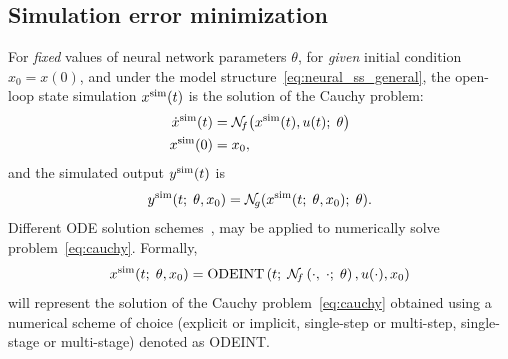 \documentclass{article} %
\newcommand{\NN}{\mathcal{N}} %
\newcommand{\simul}[1]{{#1}^{\rm sim}}
\newcommand{\est}{}
\begin{document}
{
\subsection{Simulation error minimization}
}
For \emph{fixed} values of neural network parameters $\theta$, for \emph{given} initial condition $x_0 = x(0)$, and under the model  structure~\eqref{eq:neural_ss_general},  the open-loop state simulation $\simul{x}(t)$ is the solution of the Cauchy problem:
\begin{subequations}
\label{eq:cauchy}
\begin{align}
{\simul{ \dot x}}(t) &= \NN_{\!f}\big(\simul{x}(t), u(t);\; \theta \big) \\
 \simul{x}(0)        &= x_0,
\end{align}
\end{subequations}
and the simulated output ${\simul{\est{y}}}(t)$ is 
\begin{equation}
\label{eq:output_equation}
 {\simul{\est{y}}}(t;\;\theta, x_0) = \NN_{\!g}(\simul{x}(t;\;\theta, x_0);\;\theta). 
\end{equation}
Different  ODE solution schemes~\citep{quarteroni2010numerical}, may be applied to numerically solve problem~\eqref{eq:cauchy}.  
Formally, 
\begin{equation}
\label{eq:cauchy_approx}
 \simul{x}(t;\;\theta, x_0) = \text{ODEINT}\left(t;\; \NN_{\!f}\left(\cdot,\; \cdot;\; \theta\right), u(\cdot), x_0 \right)
\end{equation}
will represent the solution of the Cauchy problem~\eqref{eq:cauchy} obtained  using a numerical scheme of choice (explicit or implicit, single-step or multi-step, single-stage or multi-stage) denoted as ODEINT.

\end{document}
